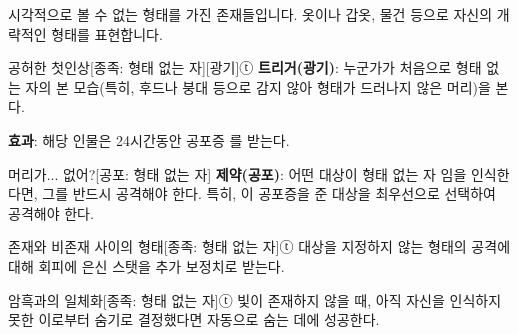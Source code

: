 \documentclass{report}
\begin{document}
	시각적으로 볼 수 없는 형태를 가진 존재들입니다. 옷이나 갑옷, 물건 등으로 자신의 개략적인 형태를 표현합니다.
	
	\begin{story}{공허한 첫인상}{[종족: 형태 없는 자][광기]ⓣ}
		\textbf{트리거(광기)}: 누군가가 처음으로 형태 없는 자의 본 모습(특히, 후드나 붕대 등으로 감지 않아 형태가 드러나지 않은 머리)을 본다.
		
		\textbf{효과}: 해당 인물은 24시간동안 공포증 를 받는다.
		
	\end{story}
	
	\begin{story}{머리가... 없어?}{[공포: 형태 없는 자]}
		\textbf{제약(공포)}: 어떤 대상이 형태 없는 자 임을 인식한다면, 그를 반드시 공격해야 한다. 특히, 이 공포증을 준 대상을 최우선으로 선택하여 공격해야 한다.
		
	\end{story}
	
	\begin{story}{존재와 비존재 사이의 형태}{[종족: 형태 없는 자]ⓣ}
		대상을 지정하지 않는 형태의 공격에 대해 회피에 은신 스탯을 추가 보정치로 받는다.
		
	\end{story}
	
	\begin{story}{암흑과의 일체화}{[종족: 형태 없는 자]ⓣ}
		빛이 존재하지 않을 때, 아직 자신을 인식하지 못한 이로부터 숨기로 결정했다면 자동으로 숨는 데에 성공한다.
		
	\end{story}
\end{document}
